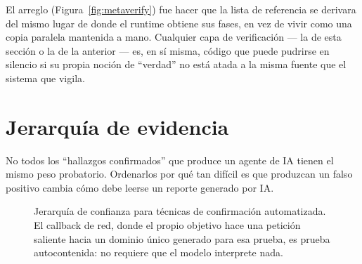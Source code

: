 \documentclass[10pt]{article}
\begin{document}
El arreglo (Figura~\ref{fig:metaverify}) fue hacer que la lista de referencia se derivara del mismo lugar de donde el runtime obtiene sus fases, en vez de vivir como una copia paralela mantenida a mano. Cualquier capa de verificación --- la de esta sección o la de la anterior --- es, en sí misma, código que puede pudrirse en silencio si su propia noción de ``verdad'' no está atada a la misma fuente que el sistema que vigila.

\section{Jerarquía de evidencia}

No todos los ``hallazgos confirmados'' que produce un agente de IA tienen el mismo peso probatorio. Ordenarlos por qué tan difícil es que produzcan un falso positivo cambia cómo debe leerse un reporte generado por IA.

\begin{figure}[h]
\centering
{}
\caption{Jerarquía de confianza para técnicas de confirmación automatizada. El callback de red, donde el propio objetivo hace una petición saliente hacia un dominio único generado para esa prueba, es prueba autocontenida: no requiere que el modelo interprete nada.}
\label{fig:hierarchy}
\end{figure}
\end{document}
